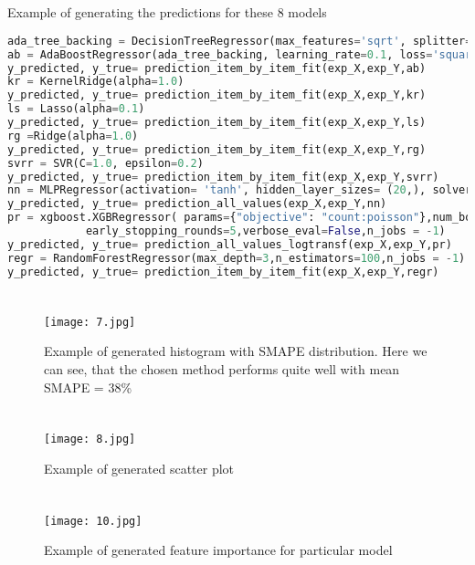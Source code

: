 \documentclass{article}
\begin{document}
\begin{appendices}
\section{}
Example of generating the predictions for these 8 models
\label{appendix:two}
\begin{lstlisting}[language =Python, breaklines=True]  
ada_tree_backing = DecisionTreeRegressor(max_features='sqrt', splitter='random', min_samples_split=3, max_depth=3)
ab = AdaBoostRegressor(ada_tree_backing, learning_rate=0.1, loss='square', n_estimators=100)
y_predicted, y_true= prediction_item_by_item_fit(exp_X,exp_Y,ab)
kr = KernelRidge(alpha=1.0)
y_predicted, y_true= prediction_item_by_item_fit(exp_X,exp_Y,kr)
ls = Lasso(alpha=0.1)
y_predicted, y_true= prediction_item_by_item_fit(exp_X,exp_Y,ls)
rg =Ridge(alpha=1.0)
y_predicted, y_true= prediction_item_by_item_fit(exp_X,exp_Y,rg)
svrr = SVR(C=1.0, epsilon=0.2)
y_predicted, y_true= prediction_item_by_item_fit(exp_X,exp_Y,svrr)
nn = MLPRegressor(activation= 'tanh', hidden_layer_sizes= (20,), solver= 'lbfgs')
y_predicted, y_true= prediction_all_values(exp_X,exp_Y,nn)
pr = xgboost.XGBRegressor( params={"objective": "count:poisson"},num_boost_round=100000,
            early_stopping_rounds=5,verbose_eval=False,n_jobs = -1)
y_predicted, y_true= prediction_all_values_logtransf(exp_X,exp_Y,pr)
regr = RandomForestRegressor(max_depth=3,n_estimators=100,n_jobs = -1)
y_predicted, y_true= prediction_item_by_item_fit(exp_X,exp_Y,regr)

\end{lstlisting}

\section{}
\begin{figure}[H]
\texttt{[image: 7.jpg]}
\centering
\caption{Example of generated histogram with SMAPE distribution. Here we can see, that the chosen method performs quite well with mean SMAPE = 38\%}
\label{appendix:three}
\end{figure}


\section{}
\begin{figure}[H]
\texttt{[image: 8.jpg]}
\centering
\caption{Example of generated scatter plot}
\label{appendix:four}
\end{figure}

\section{}
\begin{figure}[H]
\texttt{[image: 10.jpg]}
\centering
\caption{Example of generated feature importance for particular model}
\label{appendix:five}
\end{figure}

\end{appendices}
\end{document}
